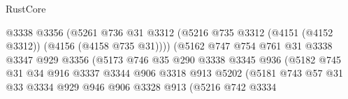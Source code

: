\begin{lexlean}{RustCore}
\begin{coremodule}
                                        @3338
                                        @3356
                                        (@5261
                                          @736
                                          @31
                                          @3312
                                          (@5216
                                            @735
                                            @3312
                                            (@4151 (@4152 @3312))
                                            (@4156 (@4158 @735 @31))))
                                        (@5162
                                          @747
                                          @754
                                          @761
                                          @31
                                          @3338
                                          @3347
                                          @929
                                          @3356
                                          (@5173
                                            @746
                                            @35
                                            @290
                                            @3338
                                            @3345
                                            @936
                                            (@5182
                                              @745
                                              @31
                                              @34
                                              @916
                                              @3337
                                              @3344
                                              @906
                                              @3318
                                              @913
                                              @5202
                                              (@5181
                                                @743
                                                @57
                                                @31
                                                @33
                                                @3334
                                                @929
                                                @946
                                                @906
                                                @3328
                                                @913
                                                (@5216
                                                  @742
                                                  @3334

\end{coremodule}
\end{lexlean}

